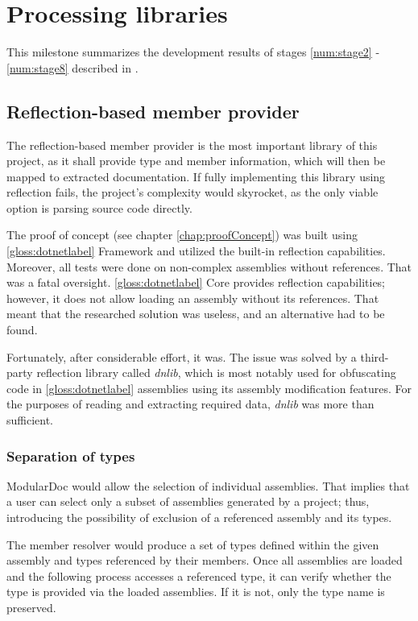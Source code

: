 \chapter{Processing libraries} \label{chap:processingLibraries}

This milestone summarizes the development results of stages \ref{num:stage2} - \ref{num:stage8} described in .

\section{Reflection-based member provider}

The reflection-based member provider is the most important library of this project, as it shall provide type and member information, which will then be mapped to extracted documentation. If fully implementing this library using reflection fails, the project's complexity would skyrocket, as the only viable option is parsing source code directly.

The proof of concept (see chapter \ref{chap:proofConcept}) was built using \ref{gloss:dotnetlabel} Framework and utilized the built-in reflection capabilities. Moreover, all tests were done on non-complex assemblies without references. That was a fatal oversight. \ref{gloss:dotnetlabel} Core provides reflection capabilities; however, it does not allow loading an assembly without its references. That meant that the researched solution was useless, and an alternative had to be found.

Fortunately, after considerable effort, it was. The issue was solved by a third-party reflection library called \textit{dnlib}, which is most notably used for obfuscating code in \ref{gloss:dotnetlabel} assemblies using its assembly modification features. For the purposes of reading and extracting required data, \textit{dnlib} was more than sufficient.

\subsection{Separation of types}

ModularDoc would allow the selection of individual assemblies. That implies that a user can select only a subset of assemblies generated by a project; thus, introducing the possibility of exclusion of a referenced assembly and its types.

The member resolver would produce a set of types defined within the given assembly and types referenced by their members. Once all assemblies are loaded and the following process accesses a referenced type, it can verify whether the type is provided via the loaded assemblies. If it is not, only the type name is preserved.

